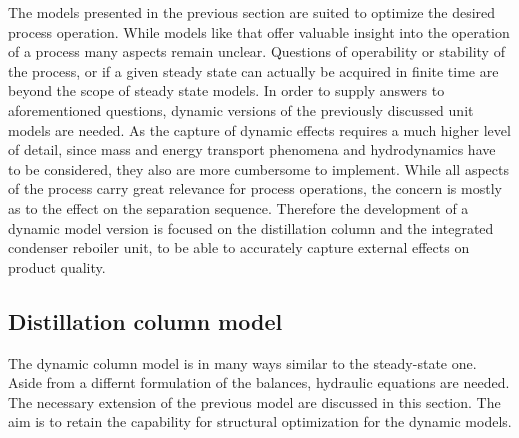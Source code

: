The models presented in the previous section are suited to optimize the desired process 
operation. While models like that offer valuable insight into the operation of a process many 
aspects remain unclear. Questions of operability or stability of the process, or if a given
steady state can actually be acquired in finite time are beyond the scope of steady state models. 
In order to supply answers to aforementioned questions, dynamic versions of the previously 
discussed unit models are needed. As the capture of dynamic effects requires a much higher 
level of detail, since mass and energy transport phenomena and hydrodynamics have to be considered,
they also are more cumbersome to implement. While all aspects of the process carry great relevance 
for process operations, the concern is mostly as to the effect on the separation sequence. 
Therefore the development of a dynamic model version is focused on the distillation column 
and the integrated condenser reboiler unit, to be able to accurately capture external effects 
on product quality. 

    \subsection{Distillation column model}
    \label{sec:mathpro:dynamic:column}
    The dynamic column model is in many ways similar to the steady-state one. Aside from a differnt formulation 
    of the balances, hydraulic equations are needed. The necessary extension of the previous model 
    are discussed in this section. The aim is to retain the capability for structural optimization 
    for the dynamic models.

